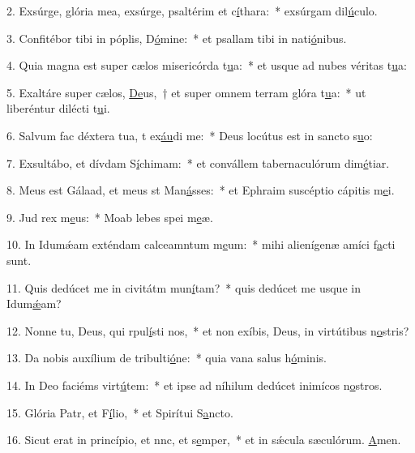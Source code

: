 2. Exsúrge, glória mea, exsúrge, psaltérim et c\uline{í}thara:~* exsúrgam dil\uline{ú}culo.\par 
3. Confitébor tibi in póplis, D\uline{ó}mine:~* et psallam tibi in nati\uline{ó}nibus.\par 
4. Quia magna est super cælos misericórda t\uline{u}a:~* et usque ad nubes véritas t\uline{u}a:\par 
5. Exaltáre super cælos, \uline{De}us,~† et super omnem terram glóra t\uline{u}a:~* ut liberéntur dilécti t\uline{u}i.\par 
6. Salvum fac déxtera tua, t ex\uline{áu}di me:~* Deus locútus est in sancto s\uline{u}o:\par 
7. Exsultábo, et dívdam S\uline{í}chimam:~* et convállem tabernaculórum dim\uline{é}tiar.\par 
8. Meus est Gálaad, et meus st Man\uline{á}sses:~* et Ephraim suscéptio cápitis m\uline{e}i.\par 
9. Jud rex m\uline{e}us:~* Moab lebes spei m\uline{e}æ.\par 
10. In Idumǽam exténdam calceamntum m\uline{e}um:~* mihi alienígenæ amíci f\uline{a}cti sunt.\par 
11. Quis dedúcet me in civitátm mun\uline{í}tam?~* quis dedúcet me usque in Idum\uline{ǽ}am?\par 
12. Nonne tu, Deus, qui rpul\uline{í}sti nos,~* et non exíbis, Deus, in virtútibus n\uline{o}stris?\par 
13. Da nobis auxílium de tribulti\uline{ó}ne:~* quia vana salus h\uline{ó}minis.\par 
14. In Deo faciéms virt\uline{ú}tem:~* et ipse ad níhilum dedúcet inimícos n\uline{o}stros.\par 
15. Glória Patr, et F\uline{í}lio,~* et Spirítui S\uline{a}ncto.\par 
16. Sicut erat in princípio, et nnc, et s\uline{e}mper,~* et in sǽcula sæculórum. \uline{A}men.\par 
